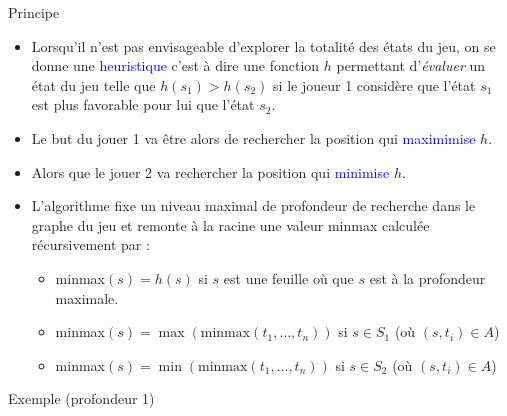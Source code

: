 \documentclass[10pt]{beamer}
\begin{document}
\begin{frame}[fragile]{\Ctitle}{\stitle}
	\begin{block}{Principe}
		\begin{itemize}
		\item<1-> Lorsqu'il n'est pas envisageable d'explorer la totalité des états du jeu, on se donne une \textcolor{blue}{heuristique} c'est à dire une fonction $h$ permettant d'\textit{évaluer} un état du jeu telle que $h(s_1) > h(s_2)$ si le joueur 1 considère que l'état $s_1$ est plus favorable pour lui que l'état $s_2$.
		\item<2-> Le but du jouer 1 va être alors de rechercher la position qui \textcolor{blue}{maximimise} $h$.
		\item<3-> Alors que le jouer 2 va  rechercher la position qui \textcolor{blue}{minimise} $h$.
		\item<4-> L'algorithme fixe un niveau maximal de profondeur de recherche dans le graphe du jeu et remonte à la racine une valeur minmax calculée récursivement par :
		\begin{itemize}
		\item<5-> minmax$(s) = h(s)$ si $s$ est une feuille où que $s$ est à la profondeur maximale.
		\item<6-> minmax$(s) = \max(\text{minmax}(t_1,\dots,t_n))$ si $s \in S_1$ (où $(s,t_i) \in A$)
		\item<7-> minmax$(s) = \min(\text{minmax}(t_1,\dots,t_n))$ si $s \in S_2$ (où $(s,t_i) \in A$)
		\end{itemize}
	\end{itemize}
	\end{block}
\end{frame}

\newcommand{\UN}[1]{\TCircle[radius=0.25cm,fillcolor=red!20!white,fillstyle=solid]{#1}}
\newcommand{\DE}[1]{\TCircle[radius=0.25cm,fillcolor=blue!20!white,fillstyle=solid]{#1}}
\begin{frame}[fragile]{\Ctitle}{\stitle}
	\begin{exampleblock}{Exemple (profondeur 1)}
		\begin{center}
			\pstree[arrows=->,treesep=0.8cm,levelsep=1.2cm]{\UN{}}{
						      \DE{3} \DE{2} \DE{7} \DE{5}}
		\end{center}
		\medskip
	\end{exampleblock}
\end{frame}
\end{document}
